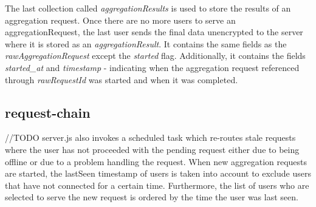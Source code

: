\begin{samepage}
The last collection called \textit{aggregationResults} is used to store the results of an aggregation request. Once there are no more users to serve an aggregationRequest, the last user sends the final data unencrypted to the server where it is stored as an \textit{aggregationResult}. It contains the same fields as the \textit{rawAggregationRequest} except the \textit{started} flag. Additionally, it contains the fields \textit{started\_at} and \textit{timestamp} - indicating when the aggregation request referenced through \textit{rawRequestId} was started and when it was completed.
\end{samepage}

\subsection{request-chain}\label{request-chain}
//TODO
server.js also invokes a scheduled task which re-routes stale requests where the user has not proceeded with the pending request either due to being offline or due to a problem handling the request. When new aggregation requests are started, the lastSeen timestamp of users is taken into account to exclude users that have not connected for a certain time. Furthermore, the list of users who are selected to serve the new request is ordered by the time the user was last seen.